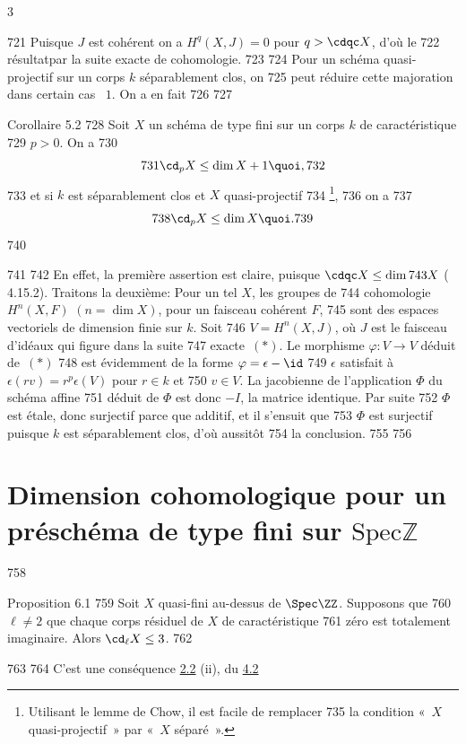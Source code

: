 3	\documentclass[10pt]{../fichiers-configuration-latex/smfart}
\begin{document}
   721	Puisque $J$ est cohérent on a $H^q(X,J)=0$ pour $q>\cdqc X$, d'où le
   722	résultat\pageoriginale par la suite exacte de cohomologie.
   723	
   724	Pour un schéma quasi-projectif sur un corps $k$ séparablement clos, on
   725	peut réduire cette majoration dans certain cas  $1$. On a en fait
   726	
   727	\begin{enonce*}{Corollaire 5.2}
   728	Soit $X$ un schéma de type fini sur un corps $k$ de caractéristique
   729	$p>0$. On a
   730	$$
   731	\cd_pX\leq \dim X+1{\quoi},
   732	$$
   733	et si $k$ est séparablement clos et $X$ quasi-projectif
   734	\footnote[1]{Utilisant le lemme de Chow, il est facile de remplacer
   735	  la condition « $X$ quasi-projectif » par « $X$ séparé ».},
   736	on a
   737	$$
   738	\cd_pX\leq \dim X{\quoi}.
   739	$$
   740	\end{enonce*}
   741	
   742	En effet, la première assertion est claire, puisque $\cdqc X\leq \dim
   743	X$ (\cite{6} 4.15.2). Traitons la deuxième: Pour un tel $X$, les groupes de
   744	cohomologie $H^n(X,F)$ $(n=\dim X)$, pour un faisceau cohérent $F$,
   745	sont des espaces vectoriels de dimension finie sur $k$. Soit
   746	$V=H^n(X,J)$, où $J$ est le faisceau d'idéaux qui figure dans la suite
   747	exacte $(\ast)$. Le morphisme $\varphi:V\rightarrow V$ déduit de $(\ast)$
   748	est évidemment de la forme $\varphi=\epsilon-\id$ 
   749	$\epsilon$ satisfait à $\epsilon(rv)=r^p\epsilon(V)$ pour $r\in k$ et
   750	$v\in V$. La jacobienne de l'application $\Phi$ du schéma affine
   751	déduit de $\Phi$ est donc $-I$,  la matrice identique. Par suite
   752	$\Phi$ est étale, donc surjectif parce que additif, et il s'ensuit que
   753	$\Phi$ est surjectif puisque $k$ est séparablement clos, d'où aussitôt
   754	la conclusion.
   755	
   756	\section{Dimension cohomologique pour un préschéma de type fini sur $\mathrm{Spec} ℤ$}	
   758	\begin{enonce*}{Proposition 6.1}
   759	Soit $X$ quasi-fini au-dessus de $\Spec \ZZ$. Supposons que
   760	$\ell\neq 2$  que chaque corps résiduel de $X$ de caractéristique
   761	zéro est totalement imaginaire. Alors $\cd_{\ell}X\leq 3$.
   762	\end{enonce*}
   763	
   764	C'est une conséquence   \hyperref[X.thm2.2]{2.2} (ii), du  \hyperref[X.cor4.2]{4.2}
\end{document}
